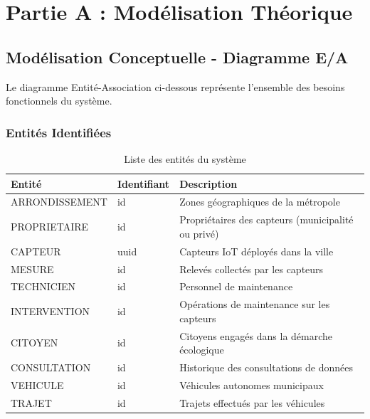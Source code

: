 \documentclass[12pt,a4paper]{article}
\begin{document}
\section{Partie A : Modélisation Théorique}

\subsection{Modélisation Conceptuelle - Diagramme E/A}

Le diagramme Entité-Association ci-dessous représente l'ensemble des besoins fonctionnels du système.

\subsubsection{Entités Identifiées}

\begin{table}[h]
\centering
\begin{tabular}{|l|l|p{8cm}|}
\hline
\textbf{Entité} & \textbf{Identifiant} & \textbf{Description} \\
\hline
ARRONDISSEMENT & id & Zones géographiques de la métropole \\
\hline
PROPRIETAIRE & id & Propriétaires des capteurs (municipalité ou privé) \\
\hline
CAPTEUR & uuid & Capteurs IoT déployés dans la ville \\
\hline
MESURE & id & Relevés collectés par les capteurs \\
\hline
TECHNICIEN & id & Personnel de maintenance \\
\hline
INTERVENTION & id & Opérations de maintenance sur les capteurs \\
\hline
CITOYEN & id & Citoyens engagés dans la démarche écologique \\
\hline
CONSULTATION & id & Historique des consultations de données \\
\hline
VEHICULE & id & Véhicules autonomes municipaux \\
\hline
TRAJET & id & Trajets effectués par les véhicules \\
\hline
\end{tabular}
\caption{Liste des entités du système}
\end{table}
\end{document}
